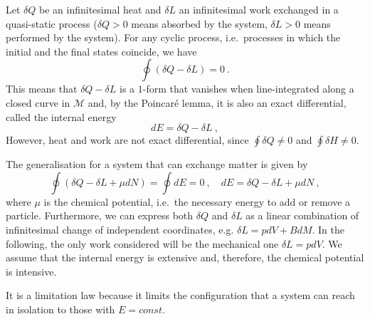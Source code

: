     \begin{law}[1st]
        Let $\delta Q$ be an infinitesimal heat and $\delta L$ an infinitesimal work exchanged in a quasi-static process ($\delta Q > 0$ means absorbed by the system, $\delta L > 0$ means performed by the system). For any cyclic process, i.e.~processes in which the initial and the final states coincide, we have
        \begin{equation*}
            \oint (\delta Q - \delta L) = 0 ~.
        \end{equation*}
        This means that $\delta Q - \delta L$ is a $1$-form that vanishes when line-integrated along a closed curve in $\mathcal M$ and, by the Poincaré lemma, it is also an exact differential, called the internal energy
        \begin{equation*}
            dE = \delta Q - \delta L ~,
        \end{equation*}
        However, heat and work are not exact differential, since $\oint \delta Q \neq 0$ and $\oint \delta H \neq 0$. 
        
        The generalisation for a system that can exchange matter is given by
        \begin{equation}\label{td:1st}
            \oint (\delta Q - \delta L + \mu dN) = \oint dE = 0 ~, \quad dE = \delta Q - \delta L + \mu dN ~,
        \end{equation}
        where $\mu$ is the chemical potential, i.e.~the necessary energy to add or remove a particle. Furthermore, we can express both $\delta Q$ and $\delta L$ as a linear combination of infinitesimal change of independent coordinates, e.g. $\delta L = p dV + B dM$. In the following, the only work considered will be the mechanical one $\delta L = p dV$. We assume that the internal energy is extensive and, therefore, the chemical potential is intensive.
    \end{law}

    It is a limitation law because it limits the configuration that a system can reach in isolation to those with $E = const$. 


